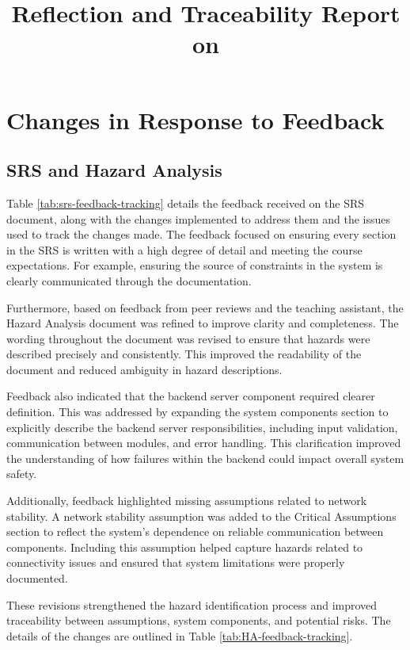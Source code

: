 \documentclass{article}
\title{Reflection and Traceability Report on \progname}
\author{\authname}
\date{}
\begin{document}
\maketitle

\section{Changes in Response to Feedback}

\subsection{SRS and Hazard Analysis}
Table \ref{tab:srs-feedback-tracking} details the feedback received on the SRS 
document, along with the changes implemented to address them and the issues used to track the changes made.
The feedback focused on ensuring every section in the SRS is written with a high degree 
of detail and meeting the course expectations. For example, ensuring the source of constraints 
in the system is clearly communicated through the documentation. 

Furthermore, based on feedback from peer reviews and the teaching assistant, the Hazard Analysis
document was refined to improve clarity and completeness. The wording throughout the
document was revised to ensure that hazards were described precisely and consistently.
This improved the readability of the document and reduced ambiguity in hazard
descriptions.

Feedback also indicated that the backend server component required clearer definition.
This was addressed by expanding the system components section to explicitly describe
the backend server responsibilities, including input validation, communication between
modules, and error handling. This clarification improved the understanding of how failures
within the backend could impact overall system safety.

Additionally, feedback highlighted missing assumptions related to network stability.
A network stability assumption was added to the Critical Assumptions section to reflect
the system’s dependence on reliable communication between components. Including this
assumption helped capture hazards related to connectivity issues and ensured that system
limitations were properly documented.

These revisions strengthened the hazard identification process and improved traceability
between assumptions, system components, and potential risks. The details of the changes 
are outlined in Table \ref{tab:HA-feedback-tracking}.
\end{document}
